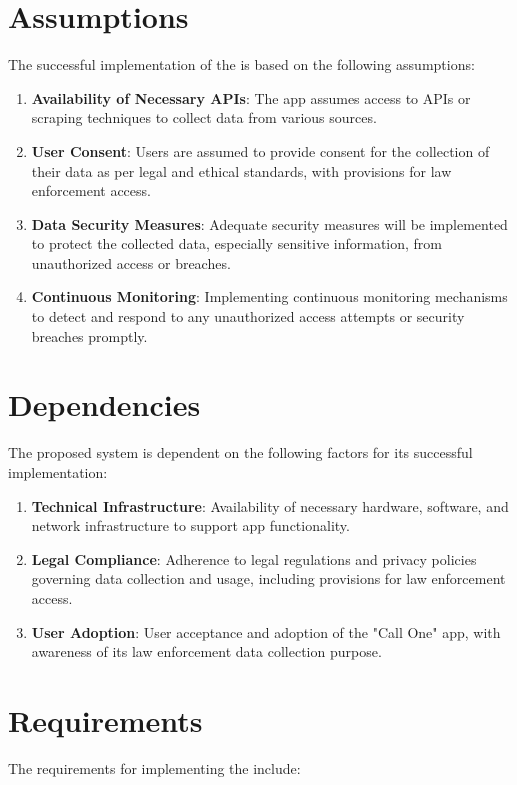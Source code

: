 \section{Assumptions}
The successful implementation of the \textbf{{\myprojectname}} is based on the following assumptions:
\begin{enumerate}[label=\roman*.]
    \item \textbf{Availability of Necessary APIs}: The app assumes access to APIs or scraping techniques to collect data from various sources.
    \item \textbf{User Consent}: Users are assumed to provide consent for the collection of their data as per legal and ethical standards, with provisions for law enforcement access.
    \item \textbf{Data Security Measures}: Adequate security measures will be implemented to protect the collected data, especially sensitive information, from unauthorized access or breaches.
    \item \textbf{Continuous Monitoring}: Implementing continuous monitoring mechanisms to detect and respond to any unauthorized access attempts or security breaches promptly.
\end{enumerate}

\section{Dependencies}
The proposed system is dependent on the following factors for its successful implementation:
\begin{enumerate}[label=\roman*.]
    \item \textbf{Technical Infrastructure}: Availability of necessary hardware, software, and network infrastructure to support app functionality.
    \item \textbf{Legal Compliance}: Adherence to legal regulations and privacy policies governing data collection and usage, including provisions for law enforcement access.
    \item \textbf{User Adoption}: User acceptance and adoption of the "Call One" app, with awareness of its law enforcement data collection purpose.
\end{enumerate}

\section{Requirements}

The requirements for implementing the {\myprojectname} include:

